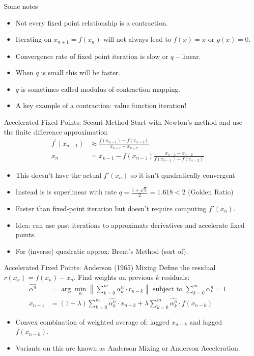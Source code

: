 \documentclass[xcolor=pdftex,dvipsnames,table,mathserif,aspectratio=169]{beamer}
\begin{document}
\begin{frame}{Some notes}
\begin{itemize}
\item Not every fixed point relationship is a contraction.
\item Iterating on $x_{n+1} = f(x_n)$ will not always lead to $f(x) = x$ or $g(x) =0$.
\item Convergence rate of fixed point iteration is \alert{slow} or $q-$linear.
\item When $q$ is small this will be faster.
\item $q$ is sometimes called \alert{modulus} of contraction mapping.
\item A key example of a contraction: \alert{value function iteration}!
\end{itemize}
\end{frame}

\begin{frame}{Accelerated Fixed Points: Secant Method}
Start with Newton's method and use the finite difference approximation
\begin{align*}
f^{\prime}\left(x_{n-1}\right)  &\approx \frac{f\left(x_{n-1}\right)-f\left(x_{n-2}\right)}{x_{n-1}-x_{n-2}} \\
x_{n}&=x_{n-1}-f\left(x_{n-1}\right) \frac{x_{n-1}-x_{n-2}}{f\left(x_{n-1}\right)-f\left(x_{n-2}\right)}
\end{align*}
\begin{itemize}
\item This doesn't have the actual $f'(x_n)$ so it isn't quadratically convergent
\item Instead is is superlinear with rate $q = \frac{1 + \sqrt{5}}{2}=1.618 < 2$ (Golden Ratio)
\item Faster than fixed-point iteration but doesn't require computing $f'(x_n)$.
\item Idea: can use past iterations to approximate derivatives and accelerate fixed points.
\item For (inverse) quadratic approx: \alert{Brent's Method} (sort of).
\end{itemize}
\end{frame}

\begin{frame}{Accelerated Fixed Points: Anderson (1965) Mixing}
Define the residual $r(x_n) = f(x_n) - x_n$. Find weights on previous $k$ residuals:
\begin{align*}
\widehat{\alpha^{n}} &= \arg \min_{\alpha} \left\|\sum_{k=0}^{m} \alpha_{k}^{n} \cdot r_{n-k}\right\| \text { subject to } \sum_{k=0}^{m} \alpha_{k}^{n}=1\\
x_{n+1}&=\left(1-\lambda\right) \sum_{k=0}^{m} \widehat{\alpha_{k}^{n}}\cdot x_{n-k}+\lambda \sum_{k=0}^{m}\widehat{\alpha_{k}^{n}}\cdot f\left(x_{n-k}\right)
\end{align*}
\begin{itemize}
\item Convex combination of weighted average of: lagged $x_{n-k}$ and lagged $f(x_{n-k})$.
\item Variants on this are known as \alert{Anderson Mixing} or \alert{Anderson Acceleration}.
\end{itemize}
\end{frame}
\end{document}
